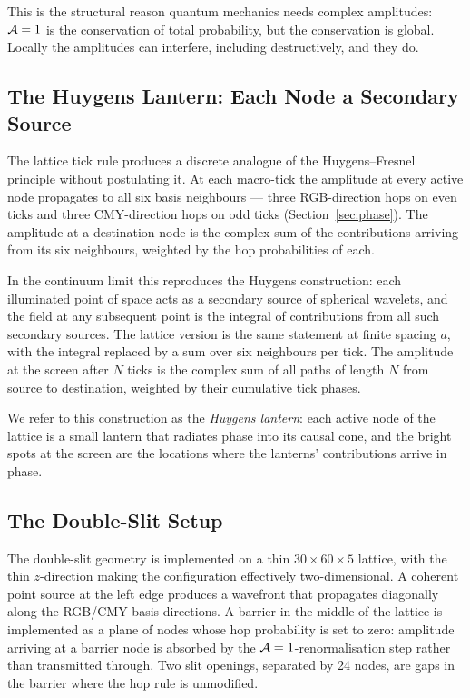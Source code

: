 This is the structural reason quantum mechanics needs complex
amplitudes: $\mathcal{A}=1$ is the conservation of total probability, but
the conservation is global. Locally the amplitudes can interfere,
including destructively, and they do.

\subsection{The Huygens Lantern: Each Node a Secondary Source}
\label{subsec:huygens_lantern}

The lattice tick rule produces a discrete analogue of the
Huygens--Fresnel principle without postulating it. At each macro-tick
the amplitude at every active node propagates to all six basis
neighbours --- three RGB-direction hops on even ticks and three
CMY-direction hops on odd ticks (Section~\ref{sec:phase}). The
amplitude at a destination node is the complex sum of the
contributions arriving from its six neighbours, weighted by the hop
probabilities of each.

In the continuum limit this reproduces the Huygens construction: each
illuminated point of space acts as a secondary source of spherical
wavelets, and the field at any subsequent point is the integral of
contributions from all such secondary sources. The lattice version
is the same statement at finite spacing $a$, with the integral
replaced by a sum over six neighbours per tick. The amplitude at the
screen after $N$ ticks is the complex sum of all paths of length
$N$ from source to destination, weighted by their cumulative tick
phases.

We refer to this construction as the \emph{Huygens lantern}: each
active node of the lattice is a small lantern that radiates phase
into its causal cone, and the bright spots at the screen are the
locations where the lanterns' contributions arrive in phase.

\subsection{The Double-Slit Setup}
\label{subsec:double_slit_setup}

The double-slit geometry is implemented on a thin
$30 \times 60 \times 5$ lattice, with the thin $z$-direction making
the configuration effectively two-dimensional. A coherent point
source at the left edge produces a wavefront that propagates
diagonally along the RGB/CMY basis directions. A barrier in the
middle of the lattice is implemented as a plane of nodes whose hop
probability is set to zero: amplitude arriving at a barrier node is
absorbed by the $\mathcal{A}=1$-renormalisation step rather than transmitted
through. Two slit openings, separated by 24 nodes, are gaps in the
barrier where the hop rule is unmodified.

